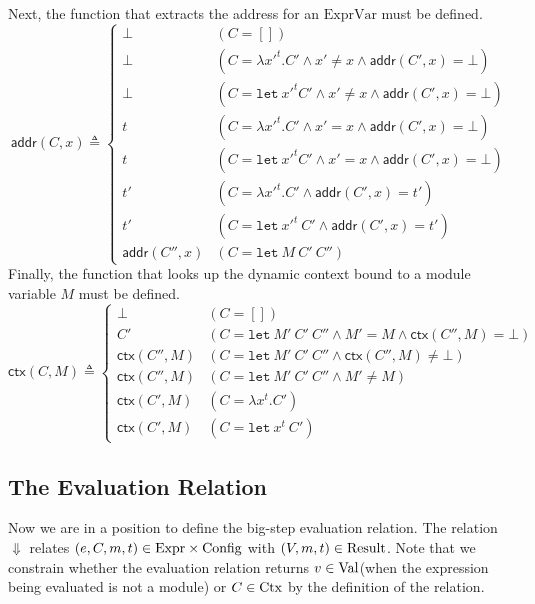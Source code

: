 \documentclass{article}
\theoremstyle{definition}
\newcommand*{\Expr}{\text{Expr}}
\newcommand*{\ExprVar}{\text{ExprVar}}
\newcommand*{\Time}{\mathbb{T}}
\newcommand*{\Ctx}[1]{\text{Ctx}\vphantom{#1}}
\newcommand*{\Value}[1]{\text{Val}\vphantom{#1}}
\newcommand*{\mem}{m}
\newcommand*{\Config}[1]{\text{Config}\vphantom{#1}}
\newcommand*{\Result}[1]{\text{Result}\vphantom{#1}}
\newcommand*{\addr}{\mathsf{addr}}
\newcommand*{\modctx}{\mathsf{ctx}}
\begin{document}
Next, the function that extracts the address for an $\ExprVar$ must be defined.
\[
  \addr(C,x)\triangleq
  \begin{cases}
    \bot         & (C=[])                                                           \\
    \bot         & (C=\lambda x'^{t}.C'\wedge x'\neq x\wedge \addr(C',x)=\bot)      \\
    \bot         & (C=\mathtt{let}\:x'^{t}C'\wedge x'\neq x\wedge \addr(C',x)=\bot) \\
    t            & (C=\lambda x'^{t}.C'\wedge x'= x\wedge \addr(C',x)=\bot)         \\
    t            & (C=\mathtt{let}\:x'^{t}C'\wedge x'= x\wedge \addr(C',x)=\bot)    \\
    t'           & (C=\lambda x'^{t}.C'\wedge \addr(C',x)=t')                       \\
    t'           & (C=\mathtt{let}\:x'^{t}\:C'\wedge \addr(C',x)=t')                \\
    \addr(C'',x) & (C=\mathtt{let}\:M\:C'\:C'')
  \end{cases}
\]
Finally, the function that looks up the dynamic context bound to a module variable $M$ must be defined.
\[
  \modctx(C,M)\triangleq
  \begin{cases}
    \bot           & (C=[])                                                             \\
    C'             & (C=\mathtt{let}\:M'\:C'\:C''\wedge M'= M\wedge\modctx(C'',M)=\bot) \\
    \modctx(C'',M) & (C=\mathtt{let}\:M'\:C'\:C''\wedge\modctx(C'',M)\neq\bot)          \\
    \modctx(C'',M) & (C=\mathtt{let}\:M'\:C'\:C''\wedge M'\neq M)                       \\
    \modctx(C',M)  & (C=\lambda x^{t}.C')                                               \\
    \modctx(C',M)  & (C=\mathtt{let}\:x^{t}\:C')
  \end{cases}
\]

\subsection{The Evaluation Relation}

Now we are in a position to define the big-step evaluation relation.
The relation $\Downarrow$ relates $(e,C,\mem,t)\in\Expr\times\Config{\Time}$ with
$(V,\mem,t)\in\Result{\Time}$.
Note that we constrain whether the evaluation relation returns $v\in\Value{\Time}$(when the expression being evaluated is not a module) or $C\in\Ctx{\Time}$ by the definition of the relation.
\end{document}
